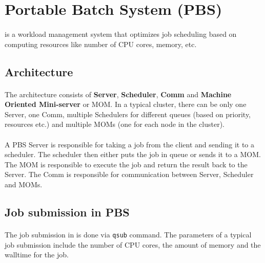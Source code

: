 
\section{Portable Batch System (PBS)} \label{sec:appendix-pbs}

\paragraph{}  is a workload management system that optimizes
\gls{job} scheduling based on computing resources like number of CPU cores,
memory, etc.


\subsection{Architecture}

\paragraph{} The  architecture consists of \textbf{Server},
\textbf{Scheduler}, \textbf{Comm} and \textbf{Machine Oriented Mini-server} or
MOM. In a typical  cluster, there can be only one Server, one
Comm, multiple Schedulers for different queues (based on priority, resources
etc.) and multiple MOMs (one for each node in the cluster).

\paragraph{} A PBS Server is responsible for taking a job from the client and
sending it to a scheduler. The scheduler then either puts the job in queue or
sends it to a MOM. The MOM is responsible to execute the job and return the
result back to the Server. The Comm is responsible for communication between
Server, Scheduler and MOMs.


\subsection{Job submission in PBS}

\paragraph{} The job submission in  is done via \texttt{qsub}
command. The parameters of a typical job submission include the number of CPU
cores, the amount of memory and the \gls{walltime} for the job.

